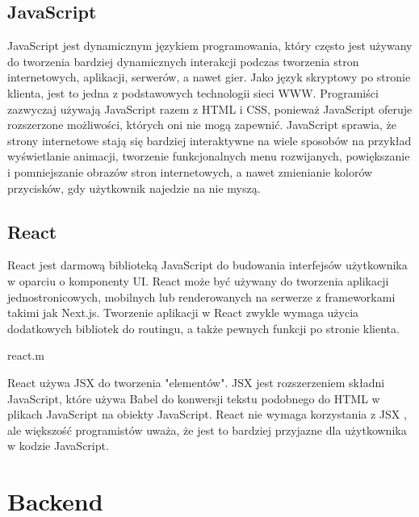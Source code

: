 \documentclass[10pt,a4paper]{report}
\begin{document}
\begin{adjustwidth}{2cm}{2cm}
\subsection{JavaScript}
\begin{minipage}{1\linewidth}
JavaScript  jest dynamicznym językiem programowania, który często jest używany do tworzenia bardziej dynamicznych interakcji podczas tworzenia stron internetowych, aplikacji, serwerów, a nawet gier. Jako język skryptowy po stronie klienta, jest to jedna z podstawowych technologii sieci WWW. Programiści zazwyczaj używają JavaScript razem z HTML i CSS, ponieważ JavaScript oferuje rozszerzone możliwości, których oni nie mogą zapewnić. JavaScript sprawia, że strony internetowe stają się bardziej interaktywne na wiele sposobów na przykład wyświetlanie animacji, tworzenie funkcjonalnych menu rozwijanych, powiększanie i pomniejszanie obrazów stron internetowych, a nawet zmienianie kolorów przycisków, gdy użytkownik najedzie na nie myszą. 
\end{minipage}
\subsection{React}
\begin{minipage}{1\linewidth}
React jest darmową biblioteką JavaScript do budowania interfejsów użytkownika w oparciu o komponenty UI. React może być używany do tworzenia aplikacji jednostronicowych, mobilnych lub renderowanych na serwerze z frameworkami takimi jak Next.js. Tworzenie aplikacji w React zwykle wymaga użycia dodatkowych bibliotek do routingu, a także pewnych funkcji po stronie klienta.
\end{minipage}
\begin{center}
\begin{lstinputlisting}[ escapeinside=``,caption={\textit{Przykładowe użycie Reacta w projekcie}}]
{react.m}
\end{lstinputlisting}
\end{center}
\begin{minipage}{1\linewidth}
React używa JSX do tworzenia "elementów". JSX jest rozszerzeniem składni JavaScript, które używa Babel do konwersji tekstu podobnego do HTML w plikach JavaScript na obiekty JavaScript. React nie wymaga korzystania z JSX , ale większość programistów uważa, że jest to bardziej przyjazne dla użytkownika w kodzie JavaScript.
\end{minipage}
\section{Backend}

\end{adjustwidth}
\end{document}
